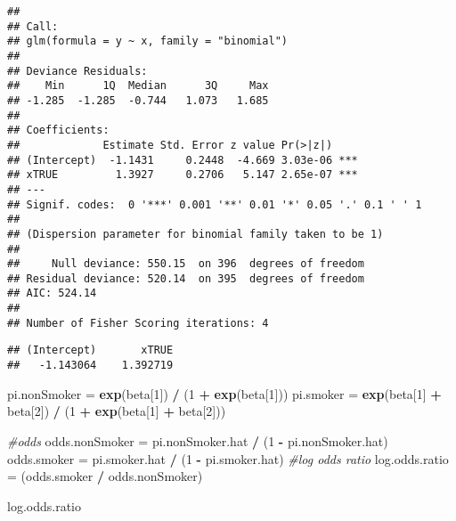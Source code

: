 \documentclass[
]{article}
\newenvironment{Shaded}{\begin{snugshade}}{\end{snugshade}}
\newcommand{\CommentTok}[1]{\textcolor[rgb]{0.56,0.35,0.01}{\textit{#1}}}
\newcommand{\DecValTok}[1]{\textcolor[rgb]{0.00,0.00,0.81}{#1}}
\newcommand{\KeywordTok}[1]{\textcolor[rgb]{0.13,0.29,0.53}{\textbf{#1}}}
\newcommand{\NormalTok}[1]{#1}
\newcommand{\OperatorTok}[1]{\textcolor[rgb]{0.81,0.36,0.00}{\textbf{#1}}}
\newcommand{\StringTok}[1]{\textcolor[rgb]{0.31,0.60,0.02}{#1}}
\begin{document}
\begin{verbatim}
## 
## Call:
## glm(formula = y ~ x, family = "binomial")
## 
## Deviance Residuals: 
##    Min      1Q  Median      3Q     Max  
## -1.285  -1.285  -0.744   1.073   1.685  
## 
## Coefficients:
##             Estimate Std. Error z value Pr(>|z|)    
## (Intercept)  -1.1431     0.2448  -4.669 3.03e-06 ***
## xTRUE         1.3927     0.2706   5.147 2.65e-07 ***
## ---
## Signif. codes:  0 '***' 0.001 '**' 0.01 '*' 0.05 '.' 0.1 ' ' 1
## 
## (Dispersion parameter for binomial family taken to be 1)
## 
##     Null deviance: 550.15  on 396  degrees of freedom
## Residual deviance: 520.14  on 395  degrees of freedom
## AIC: 524.14
## 
## Number of Fisher Scoring iterations: 4
\end{verbatim}

\begin{Shaded}
\end{Shaded}

\begin{verbatim}
## (Intercept)       xTRUE 
##   -1.143064    1.392719
\end{verbatim}

\begin{Shaded}
\begin{Highlighting}[]
\NormalTok{pi.nonSmoker =}\StringTok{ }\KeywordTok{exp}\NormalTok{(beta[}\DecValTok{1}\NormalTok{]) }\OperatorTok{/}\StringTok{ }\NormalTok{(}\DecValTok{1} \OperatorTok{+}\StringTok{ }\KeywordTok{exp}\NormalTok{(beta[}\DecValTok{1}\NormalTok{]))}
\NormalTok{pi.smoker =}\StringTok{ }\KeywordTok{exp}\NormalTok{(beta[}\DecValTok{1}\NormalTok{] }\OperatorTok{+}\StringTok{ }\NormalTok{beta[}\DecValTok{2}\NormalTok{]) }\OperatorTok{/}\StringTok{ }\NormalTok{(}\DecValTok{1} \OperatorTok{+}\StringTok{ }\KeywordTok{exp}\NormalTok{(beta[}\DecValTok{1}\NormalTok{] }\OperatorTok{+}\StringTok{ }\NormalTok{beta[}\DecValTok{2}\NormalTok{]))}

\CommentTok{#odds}
\NormalTok{odds.nonSmoker =}\StringTok{ }\NormalTok{pi.nonSmoker.hat }\OperatorTok{/}\StringTok{ }\NormalTok{(}\DecValTok{1} \OperatorTok{-}\StringTok{ }\NormalTok{pi.nonSmoker.hat)}
\NormalTok{odds.smoker =}\StringTok{ }\NormalTok{pi.smoker.hat }\OperatorTok{/}\StringTok{ }\NormalTok{(}\DecValTok{1} \OperatorTok{-}\StringTok{ }\NormalTok{pi.smoker.hat)}
\CommentTok{#log odds ratio}
\NormalTok{log.odds.ratio =}\StringTok{ }\NormalTok{(odds.smoker }\OperatorTok{/}\StringTok{ }\NormalTok{odds.nonSmoker)}

\NormalTok{log.odds.ratio}
\end{Highlighting}
\end{Shaded}
\end{document}
